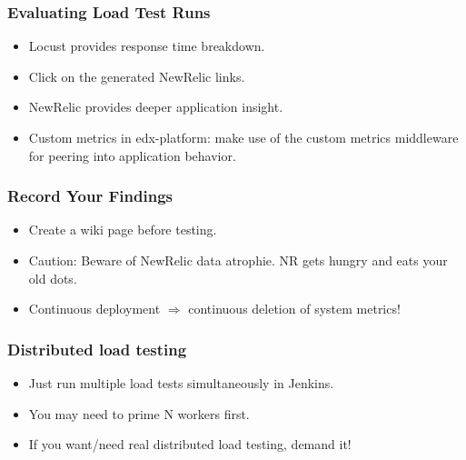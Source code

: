\documentclass{beamer}
\begin{document}
\begin{frame}
\frametitle{Evaluating Load Test Runs}
\begin{itemize}
\item Locust provides response time breakdown.\pause
\item Click on the generated NewRelic links.\pause
\item NewRelic provides deeper application insight.\pause
\item Custom metrics in edx-platform: make use of the custom metrics middleware
      for peering into application behavior.
\end{itemize}
\end{frame}


\begin{frame}
\frametitle{Record Your Findings}
\begin{itemize}
\item Create a wiki page before testing.\pause
\item Caution: Beware of NewRelic data atrophie. NR gets hungry and eats your
      old dots.\pause
\item Continuous deployment $\Rightarrow$ continuous deletion of system metrics!
\end{itemize}
\end{frame}


\begin{frame}
\frametitle{Distributed load testing}
\begin{itemize}
\item Just run multiple load tests simultaneously in Jenkins.\pause
\item You may need to prime N workers first.\pause
\item If you want/need real distributed load testing, demand it!
\end{itemize}
\end{frame}
\end{document}
